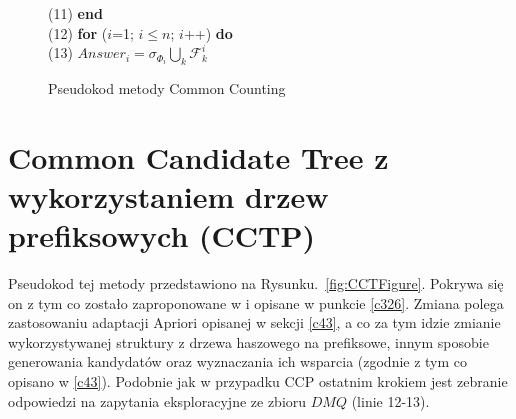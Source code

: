 \begin{figure}[h]
	\hspace*{6em} (11)\hspace{1em} \textbf{end} \\
	\hspace*{6em} (12)\hspace{1em} \textbf{for} ($i$=1; $i \leq n$; $i$++) \textbf{do} \\
	\hspace*{6em} (13)\hspace{2em}    $Answer_i = \sigma_{\Phi_i} \bigcup_k \mathcal{F}_k^i$
	\caption{Pseudokod metody Common Counting}
	\label{fig:CCFigure}
\end{figure}


\section{Common Candidate Tree z wykorzystaniem drzew prefiksowych (CCTP)}
\label{c45}
Pseudokod tej metody przedstawiono na Rysunku.~\ref{fig:CCTFigure}. Pokrywa się on z tym co zostało zaproponowane w \cite{WojciechowskiCCT} i opisane w punkcie \ref{c326}. Zmiana polega zastosowaniu adaptacji Apriori opisanej w sekcji \ref{c43}, a co za tym idzie zmianie wykorzystywanej struktury z drzewa haszowego na prefiksowe, innym sposobie generowania kandydatów oraz wyznaczania ich wsparcia (zgodnie z tym co opisano w \ref{c43}). Podobnie jak w przypadku CCP ostatnim krokiem jest zebranie odpowiedzi na zapytania eksploracyjne ze zbioru \(DMQ\) (linie 12-13).

